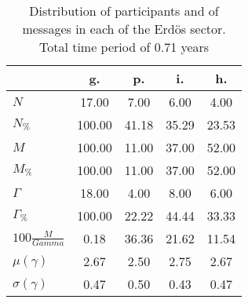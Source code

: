 \begin{table}[h!]
\begin{center}
\begin{tabular}{| l || c | c | c | c |}\hline
 & g. & p. & i. & h. \\\hline\hline
$N$ & 17.00  & 7.00  & 6.00  & 4.00 \\\hline
$N_{\%}$ & 100.00  & 41.18  & 35.29  & 23.53 \\\hline
$M$ & 100.00  & 11.00  & 37.00  & 52.00 \\\hline
$M_{\%}$ & 100.00  & 11.00  & 37.00  & 52.00 \\\hline
$\Gamma$ & 18.00  & 4.00  & 8.00  & 6.00 \\\hline
$\Gamma_{\%}$ & 100.00  & 22.22  & 44.44  & 33.33 \\\hline
$100\frac{M}{Gamma}$ & 0.18  & 36.36  & 21.62  & 11.54 \\\hline
$\mu(\gamma)$ & 2.67  & 2.50  & 2.75  & 2.67 \\\hline
$\sigma(\gamma)$ & 0.47  & 0.50  & 0.43  & 0.47 \\\hline
\end{tabular}
\caption{Distribution of participants and of messages in each of the Erd\"os sector. Total time period of 0.71 years}
\end{center}
\end{table}